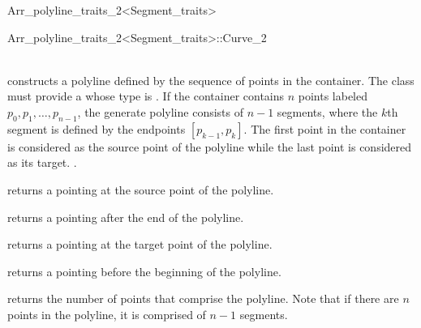 \begin{ccRefClass}{Arr_polyline_traits_2<Segment_traits>}
\begin{ccClass}{Arr_polyline_traits_2<Segment_traits>::Curve_2}

\ccTypes


    \ccCreation

     \\
  {constructs a polyline defined by the sequence of points in the container.
   The  class must provide a  whose type
   is .
   If the container contains $n$ points labeled $p_{0},p_{1},\ldots,p_{n-1}$,
   the generate polyline consists of $n-1$ segments, where the $k$th segment 
   is defined by the endpoints $[p_{k-1},p_{k}]$. The first point in the 
   container is considered as the source point of the polyline while the last 
   point is considered as its target.
   .}

\ccOperations

  {returns a  pointing at the source point of the 
   polyline.}

  {returns a  pointing after the end of the polyline.}

  {returns a  pointing at the target point of the 
   polyline.}

  {returns a  pointing before the beginning of the 
   polyline.}

  {returns the number of points that comprise the polyline. Note that if there
   are $n$ points in the polyline, it is comprised of $n-1$ segments.}

\end{ccClass}

\end{ccRefClass}


\ccRefPageEnd
